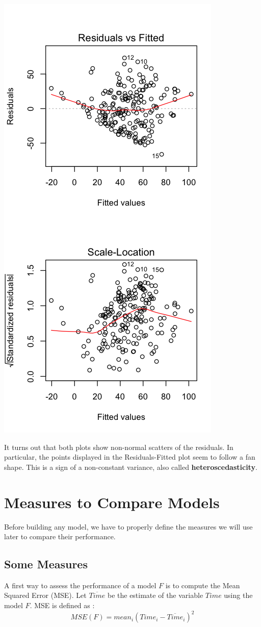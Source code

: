 \documentclass[]{report}
\begin{document}
\begin{center}
	\includegraphics[width=0.5\linewidth]{Figures/fitted_value_plots}
	\label{fig:fitted_value_plots}
\end{center}

It turns out that both plots show non-normal scatters of the residuals. In particular, the points displayed in the Residuals-Fitted plot seem to follow a fan shape. This is a sign of a non-constant variance, also called \textbf{heteroscedasticity}.

\section{Measures to Compare Models}
Before building any model, we have to properly define the measures we will use later to compare their performance. 

\subsection{Some Measures}
A first way to assess the performance of a model $F$ is to compute the Mean Squared Error (MSE). Let $\overline{Time}$ be the estimate of the variable $Time$ using the model $F$. MSE is defined as :
$$MSE(F) =  mean_i(Time_i - \overline{Time}_i)^2$$
\end{document}
